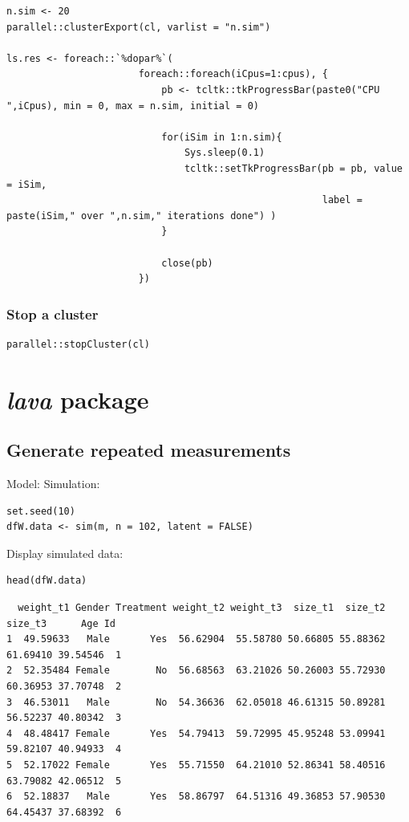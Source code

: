 \documentclass{article}
\begin{document}
\lstset{language=r,label= ,caption= ,captionpos=b,numbers=none}
\begin{lstlisting}
n.sim <- 20
parallel::clusterExport(cl, varlist = "n.sim")

ls.res <- foreach::`%dopar%`(
					   foreach::foreach(iCpus=1:cpus), {
						   pb <- tcltk::tkProgressBar(paste0("CPU ",iCpus), min = 0, max = n.sim, initial = 0)

						   for(iSim in 1:n.sim){
							   Sys.sleep(0.1)
							   tcltk::setTkProgressBar(pb = pb, value = iSim,
													   label = paste(iSim," over ",n.sim," iterations done") )
						   }

						   close(pb)
					   })
\end{lstlisting}

\subsubsection{Stop a cluster}
\label{sec:org3bad26b}

\lstset{language=r,label= ,caption= ,captionpos=b,numbers=none}
\begin{lstlisting}
parallel::stopCluster(cl)
\end{lstlisting}

\section{\emph{lava} package}
\label{sec:org7c3ae1c}
\subsection{Generate repeated measurements}
\label{sec:org33a000f}
Model:
Simulation:
\lstset{language=r,label= ,caption= ,captionpos=b,numbers=none}
\begin{lstlisting}
set.seed(10)
dfW.data <- sim(m, n = 102, latent = FALSE)
\end{lstlisting}

Display simulated data:
\lstset{language=r,label= ,caption= ,captionpos=b,numbers=none}
\begin{lstlisting}
head(dfW.data)
\end{lstlisting}

\begin{verbatim}
  weight_t1 Gender Treatment weight_t2 weight_t3  size_t1  size_t2  size_t3      Age Id
1  49.59633   Male       Yes  56.62904  55.58780 50.66805 55.88362 61.69410 39.54546  1
2  52.35484 Female        No  56.68563  63.21026 50.26003 55.72930 60.36953 37.70748  2
3  46.53011   Male        No  54.36636  62.05018 46.61315 50.89281 56.52237 40.80342  3
4  48.48417 Female       Yes  54.79413  59.72995 45.95248 53.09941 59.82107 40.94933  4
5  52.17022 Female       Yes  55.71550  64.21010 52.86341 58.40516 63.79082 42.06512  5
6  52.18837   Male       Yes  58.86797  64.51316 49.36853 57.90530 64.45437 37.68392  6
\end{verbatim}
\end{document}
